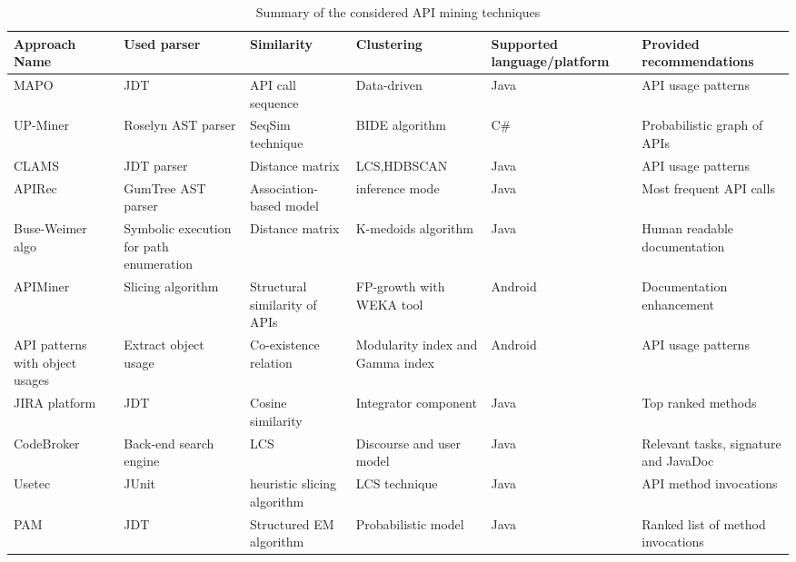 \begin{table}[t!]
		\begin{adjustbox}{width=1\textwidth}		
			  \begin{tabular}{|p{2.5cm}|p{3cm}|p{3cm}|p{4cm}|p{2cm}|p{4cm}|}
				\hline
				\textbf{Approach Name} & \textbf{Used parser}
				& 
				\textbf{Similarity} & \textbf{Clustering} & \textbf{Supported 
				language/platform} 
				& \textbf{Provided recommendations} \\
				\hline
				MAPO  &  JDT & API call sequence & Data-driven & Java &  API 
				usage patterns  
				\\
				\hline
				UP-Miner & Roselyn AST parser & SeqSim technique&  BIDE 
				algorithm & 
				C\#  &   Probabilistic graph of APIs \\
				\hline
				CLAMS & JDT parser & Distance matrix &  LCS,HDBSCAN  & Java &  
				API usage patterns  \\
				\hline
				APIRec  & GumTree AST parser &  Association-based model &  
				inference 
				mode &  Java & Most frequent API calls \\
				\hline
				Buse-Weimer algo &  Symbolic execution for  path enumeration &  
				Distance matrix & K-medoids algorithm & Java  & Human readable 
				documentation \\
				\hline 	
				APIMiner  & Slicing algorithm & Structural similarity of APIs & 
				FP-growth with WEKA tool & Android  & Documentation 
				enhancement\\
				\hline
				API patterns with object usages & Extract object usage & 
				Co-existence 
				relation &  Modularity index and Gamma index & Android & API 
				usage patterns \\
				\hline
				JIRA platform & JDT &Cosine similarity &  Integrator component 
				& 
				Java & 
				Top ranked methods \\
				\hline
				CodeBroker & Back-end search engine & LCS &  Discourse and user 
				model & 
				Java  &  Relevant tasks, signature and JavaDoc  \\
				\hline
				Usetec & JUnit & heuristic slicing algorithm & LCS technique  & 
				Java &  
				API method invocations  \\
				\hline
				PAM & JDT & Structured EM algorithm & Probabilistic model & 
				Java  
				&  
				Ranked list of method invocations \\
				\hline
	
			\end{tabular}
		\end{adjustbox}
		\caption{Summary of the considered API mining techniques}
		\label{tab:apiMiningApproaches}

\end{table} 





